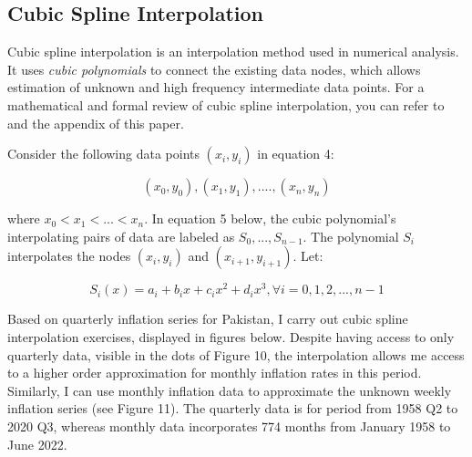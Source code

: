 \documentclass[12pt]{article}
\newcommand{\1}{\mathbbm 1}
\begin{document}
		
		
		
		\subsection{Cubic Spline Interpolation}
		
		Cubic spline interpolation is an interpolation method used in numerical analysis. It uses \textit{cubic polynomials} to connect the existing data nodes, which allows estimation of unknown and high frequency intermediate data points. For a mathematical and formal review of cubic spline interpolation, you can refer to \cite{burden2015numerical} and the appendix of this paper.
		
		Consider the following data points $(x_{i}, y_{i})$ in equation 4:
		
		\begin{equation}
			(x_{0}, y_{0}), (x_{1}, y_{1}), .... , (x_{n}, y_{n})
		\end{equation}
		
		
		where $x_{0} < x_{1} < ... < x_{n}$. In equation 5 below, the cubic polynomial's interpolating pairs of data are labeled as $S_{0},..., S_{n-1}$. The polynomial $S_{i}$ interpolates the nodes $(x_{i}, y_{i})$ and $(x_{i+1}, y_{i+1})$. Let:
		
		
		\begin{equation}
			S_{i}(x) = a_{i} + b_{i}x + c_{i}x^{2} + d_{i}x^{3}, \forall i = 0, 1, 2, ... ,n-1
		\end{equation}
		
		
		
		
		
		
		Based on quarterly inflation series for Pakistan, I carry out cubic spline interpolation exercises, displayed in figures  below. Despite having access to only quarterly data, visible in the dots of Figure 10, the interpolation allows me access to a higher order approximation for monthly inflation rates in this period. Similarly, I can use monthly inflation data  to approximate the unknown weekly inflation series (see Figure 11). The quarterly data is for period from 1958 Q2 to 2020 Q3, whereas monthly data incorporates 774 months from January 1958 to June 2022.
		
\end{document}

